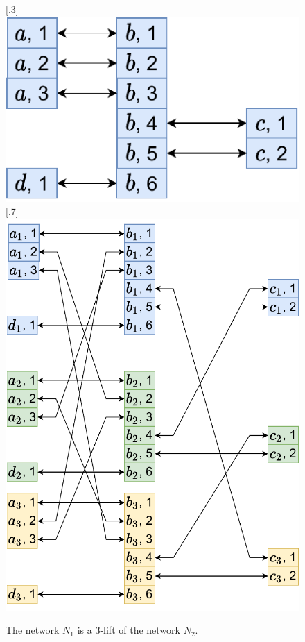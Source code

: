 \begin{figure}[H]
      [.3\linewidth] {
      \centering
      \includegraphics[scale=0.55]{diagrams/algorithm_k-lift_proof_simple_1.pdf}
    }%
      [.7\linewidth] {
      \centering
      \includegraphics[scale=0.55]{diagrams/algorithm_k-lift_proof_simple_2.pdf}
    }
    \caption{The network $N_1$ is a 3-lift of the network $N_2$.
    }
    \label{fig:algorithm:k-lift_proof_simple1}
\end{figure}


